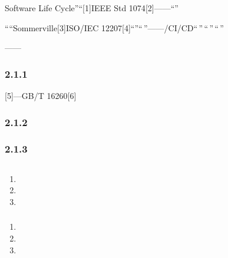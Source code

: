Software Life Cycle''``{[}1{]}IEEE Std 1074{[}2{]}------``''

````Sommerville{[}3{]}ISO/IEC
12207{[}4{]}``''``\,''------/CI/CD``\,''\,``\,''\,``\,''

------

\hypertarget{section-5}{%
\subsubsection{2.1.1}\label{section-5}}

{[}5{]}---GB/T 16260{[}6{]}

\hypertarget{section-6}{%
\subsubsection{2.1.2}\label{section-6}}

\hypertarget{section-7}{%
\subsubsection{2.1.3}\label{section-7}}

\hypertarget{section-8}{%
\subsection{}\label{section-8}}

\hypertarget{section-9}{%
\subsubsection{}\label{section-9}}

\begin{enumerate}
\def\labelenumi{\arabic{enumi}.}
\tightlist
\item
\item
\item
\end{enumerate}

\hypertarget{section-10}{%
\subsubsection{}\label{section-10}}

\begin{enumerate}
\def\labelenumi{\arabic{enumi}.}
\tightlist
\item
\item
\item
\end{enumerate}


